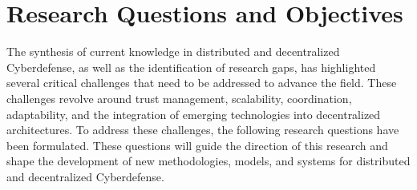 


\section{Research Questions and Objectives}

The synthesis of current knowledge in distributed and decentralized Cyberdefense, as well as the identification of research gaps, has highlighted several critical challenges that need to be addressed to advance the field. These challenges revolve around trust management, scalability, coordination, adaptability, and the integration of emerging technologies into decentralized architectures. To address these challenges, the following research questions have been formulated. These questions will guide the direction of this research and shape the development of new methodologies, models, and systems for distributed and decentralized Cyberdefense.

\




